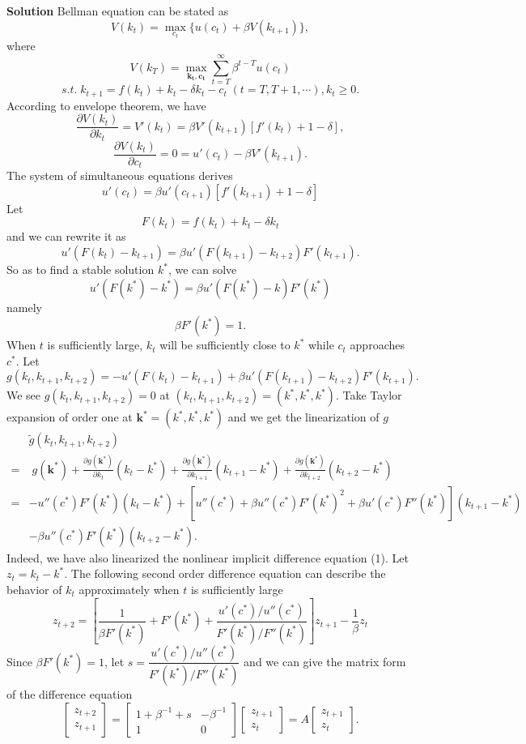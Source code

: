 \documentclass{article}
\begin{document}
\noindent\textbf{Solution} 
Bellman equation can be stated as
$$
V(k_t)=\max_{c_t}\{u(c_t)+\beta V(k_{t+1})\},
$$
where
\[
V(k_T)=\max_{\mathbf{k_t},\mathbf{c_t}}\sum_{t=T}^\infty \beta^{t-T} u(c_t) 
\]
$$
s.t.\; k_{t+1}=f(k_t)+k_t-\delta k_t-c_t\;(t=T,T+1,\cdots),k_{t}\ge 0.
$$
According to envelope theorem, we have
$$
\frac{\partial V(k_t)}{\partial k_t}=V'(k_t)=\beta V'(k_{t+1})[f'(k_t)+1-\delta],
$$
$$
\frac{\partial V(k_t)}{\partial c_t}=0=u'(c_t)-\beta V'(k_{t+1}).
$$
The system of simultaneous equations derives 
$$
u'(c_t)=\beta u'(c_{t+1})[f'(k_{t+1})+1-\delta ]
$$
Let $$F(k_t)=f(k_t)+k_t-\delta k_t$$ and we can rewrite it as 
\begin{equation}
	u'(F(k_t)-k_{t+1})=\beta u'(F(k_{t+1})-k_{t+2})F'(k_{t+1}).
\end{equation}
So as to find a stable solution $k^*$, we can solve
$$
u'(F(k^*)-k^*)=\beta u'(F(k^*)-k)F'(k^*)
$$
namely
$$
\beta F'(k^*)=1.
$$
When $t$ is sufficiently large, $k_t$ will be sufficiently close to $k^*$ while $c_t$ approaches $c^*$. Let
$$
g(k_t,k_{t+1},k_{t+2})=-u'(F(k_t)-k_{t+1})+\beta u'(F(k_{t+1})-k_{t+2})F'(k_{t+1}).
$$
We see $g(k_t,k_{t+1},k_{t+2})=0$ at $(k_t,k_{t+1},k_{t+2})=(k^*,k^*,k^*)$. Take Taylor expansion of order one at $\mathbf{k^*}=(k^*,k^*,k^*)$ and we get the linearization of $g$
\begin{align*}	
&  \widetilde{g}(k_t,k_{t+1},k_{t+2})\\
= &\;g(\mathbf{k^*})+\frac{\partial g(\mathbf{k^*})}{\partial k_t}(k_t-k^*)+\frac{\partial g(\mathbf{k^*})}{\partial k_{t+1}}(k_{t+1}-k^*)+\frac{\partial g(\mathbf{k^*})}{\partial k_{t+2}}(k_{t+2}-k^*)\\
= & -u''(c^*)F'(k^*)(k_t-k^*)+[u''(c^*)+\beta u''(c^*)F'(k^*)^2+\beta u'(c^*)F''(k^*)](k_{t+1}-k^*)\\
& -\beta u''(c^*)F'(k^*)(k_{t+2}-k^*).
\end{align*}
Indeed, we have also linearized the nonlinear implicit difference equation (1). Let $z_t=k_t-k^*$. The following second order difference equation can describe the behavior of $k_t$ approximately when $t$ is sufficiently large
\[
z_{t+2}= \left[\frac{1}{\beta F'(k^*)}+ F'(k^*)+\frac{ u'(c^*)/u''(c^*)}{F'(k^*)/F''(k^*)}\right]z_{t+1}-\frac{1}{\beta}z_t
\]
Since $\beta F'(k^*)=1$, let $s=\dfrac{ u'(c^*)/u''(c^*)}{F'(k^*)/F''(k^*)}$ and we can give the matrix form of the difference equation
$$
\begin{bmatrix}
z_{t+2}\\
z_{t+1}  
\end{bmatrix}
=
\begin{bmatrix}
1+\beta^{-1}+s&-\beta^{-1}\\
1  &0
\end{bmatrix}
\begin{bmatrix}
z_{t+1}\\
z_{t}  
\end{bmatrix}
=A
\begin{bmatrix}
z_{t+1}\\
z_{t}  
\end{bmatrix}.
$$
\end{document}
